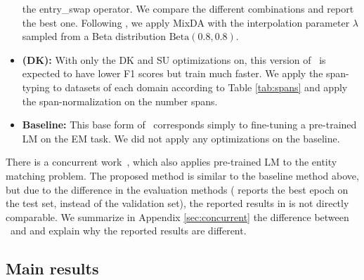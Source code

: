 \begin{itemize}
the entry\_swap operator. 
We compare the different combinations and report the best one.
Following \cite{miao2020snippext}, we apply MixDA with the interpolation parameter 
$\lambda$ sampled from a Beta distribution $\text{Beta}(0.8, 0.8)$.
\item \textbf{\system (DK): } With only the DK and SU optimizations on, this version
of \system\ is expected to have lower F1 scores but train much faster.
We apply the span-typing to datasets of each domain according to Table \ref{tab:spans} and 
apply the span-normalization on the number spans.
\item \textbf{Baseline: } This base form of \system\ corresponds
simply to fine-tuning a pre-trained LM on the EM task. We did not apply any optimizations on the baseline.
\end{itemize}
There is a concurrent work~\cite{brunner2020entity}, which also applies pre-trained LM to the entity matching
problem. The proposed method is similar to the baseline method above, but due to the difference in the
evaluation methods (\cite{brunner2020entity} reports the best epoch on the test set, instead of the validation set),
the reported results in \cite{brunner2020entity} is not directly comparable.
We summarize in Appendix \ref{sec:concurrent} the difference between \system\ and \cite{brunner2020entity}
and explain why the reported results are different.

\vspace{-1mm}
\subsection{Main results}

\iffalse Table \ref{tab:magellan} shows the results on the ER-Magellan datasets.
Overall, \system\ achieves significantly higher F1 scores than the SOTA results (DeepMatcher+).
\system\ outperforms DeepMatcher+ in 10/13 cases and by up to 25\% (Dirty, Walmart-Amazon).
On the 3 cases that \system\ performs slightly worse than DeepMatcher+,
as we show in Table \ref{tab:albert}, these small gaps can be filled
by replacing DistilBERT with larger pre-trained LMs such as BERT or ALBERT.
\fi 

